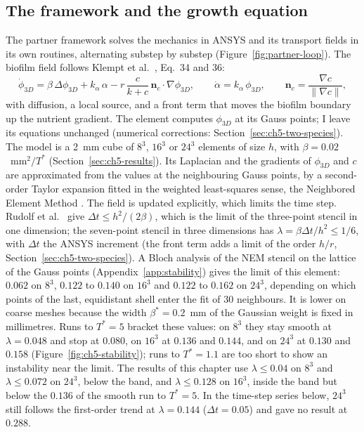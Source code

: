 \subsection{The framework and the growth equation}
The partner framework solves the mechanics in ANSYS and its transport fields in
its own routines, alternating substep by substep
(Figure~\ref{fig:partner-loop}). The biofilm field follows Klempt et
al.~\cite{Klempt2024DiffusionDrivenGrowth}, Eq.~34 and 36:
\begin{equation}
  \dot\phi_{3D} = \beta\,\Delta\phi_{3D} + k_\alpha\,\alpha
   - r\,\frac{c}{k+c}\,\mathbf n_c\cdot\nabla\phi_{3D},
  \qquad \dot\alpha = k_\alpha\,\phi_{3D} ,\qquad \mathbf n_c=\frac{\nabla c}{\|\nabla c\|},
  \label{eq:ch5-field}
\end{equation}
with diffusion, a local source, and a front term \fterm{} that moves the biofilm
boundary up the nutrient gradient. The element computes $\phi_{3D}$ at its
Gauss points; I leave its equations unchanged (numerical corrections:
Section~\ref{sec:ch5-two-species}). The model is a 2~mm cube of $8^3$, $16^3$ or
$24^3$ elements of size $h$, with $\beta=0.02$~mm$^2/T^*$ (Section~\ref{sec:ch5-results}). Its Laplacian
and the gradients of $\phi_{3D}$ and $c$ are approximated from the values at the neighbouring
Gauss points, by a second-order Taylor expansion fitted in the weighted
least-squares sense, the Neighbored Element Method
\cite{Blaszczyk2022TaylorWLS,Rudolf2025NEM}. The field is updated
explicitly, which limits the time step. Rudolf et al.~\cite{Rudolf2025NEM}
give $\Delta t\le h^2/(2\beta)$, which is the limit of
the three-point stencil in one dimension; the seven-point stencil in three
dimensions has $\lambda=\beta\Delta t/h^2\le1/6$, with $\Delta t$ the ANSYS increment (the front term
adds a limit of the order $h/r$, Section~\ref{sec:ch5-two-species}). A Bloch analysis of the
NEM stencil on the lattice of the Gauss points
(Appendix~\ref{app:stability}) gives the limit of this element: $0.062$ on $8^3$, $0.122$ to $0.140$
on $16^3$ and $0.122$ to $0.162$ on $24^3$, depending on which points of the last, equidistant shell
enter the fit of $30$ neighbours. It is lower on coarse meshes because the width $\beta^*=0.2$~mm of
the Gaussian weight is fixed in millimetres. Runs to $T^*=5$ bracket these values: on $8^3$ they
stay smooth at $\lambda=0.048$ and stop at $0.080$, on $16^3$ at $0.136$ and
$0.144$, and on $24^3$ at $0.130$ and $0.158$ (Figure~\ref{fig:ch5-stability});
runs to $T^*=1.1$ are too short to show an instability near the limit. The
results of this chapter use $\lambda\le0.04$ on $8^3$ and $\lambda\le0.072$
on $24^3$, below the band, and $\lambda\le0.128$ on $16^3$, inside the band
but below the $0.136$ of the smooth run to $T^*=5$. In the
time-step series below, $24^3$ still follows the first-order trend at $\lambda=0.144$
($\Delta t=0.05$) and gave no result at $0.288$.

